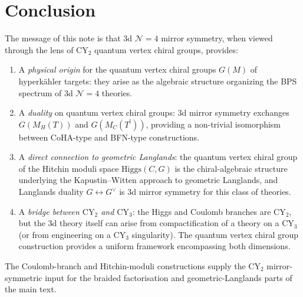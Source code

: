 \documentclass[11pt]{article}
\theoremstyle{definition}
\theoremstyle{remark}
\newcommand{\CY}{\mathrm{CY}}
\newcommand{\Higgs}{\mathrm{Higgs}}
\newcommand{\cN}{\mathcal{N}}
\begin{document}
\section{Conclusion}
\label{sec:conclusion}

The message of this note is that 3d $\cN=4$ mirror symmetry, when viewed through the lens of $\CY_2$ quantum vertex chiral groups, provides:

\begin{enumerate}[label=(\roman*)]
 \item A \emph{physical origin} for the quantum vertex chiral groups $G(M)$ of hyperk\"ahler targets: they arise as the algebraic structure organizing the BPS spectrum of 3d $\cN=4$ theories.

 \item A \emph{duality} on quantum vertex chiral groups: 3d mirror symmetry exchanges $G(M_H(T))$ and $G(M_C(T^!))$, providing a non-trivial isomorphism between CoHA-type and BFN-type constructions.

 \item A \emph{direct connection to geometric Langlands}: the quantum vertex chiral group of the Hitchin moduli space $\Higgs(C, G)$ is the chiral-algebraic structure underlying the Kapustin--Witten approach to geometric Langlands, and Langlands duality $G \leftrightarrow G^\vee$ is 3d mirror symmetry for this class of theories.

 \item A \emph{bridge between $\CY_2$ and $\CY_3$}: the Higgs and Coulomb branches are $\CY_2$, but the 3d theory itself can arise from compactification of a theory on a $\CY_3$ (or from engineering on a $\CY_3$ singularity). The quantum vertex chiral group construction provides a uniform framework encompassing both dimensions.
\end{enumerate}

The Coulomb-branch and Hitchin-moduli constructions supply the $\CY_2$ mirror-symmetric input for the braided factorisation and geometric-Langlands parts of the main text.
\end{document}
